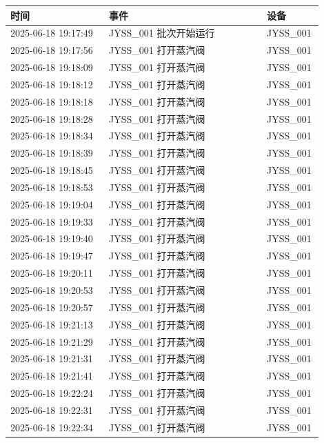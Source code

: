 \documentclass[UTF8,10pt,a4paper,fontset=fandol]{ctexart}
\begin{document}
\begin{center}
\small
\begin{tabular}{|p{0.30\linewidth}|p{0.48\linewidth}|p{0.12\linewidth}|}
\hline
\textbf{时间} & \textbf{事件} & \textbf{设备} \\
\hline
2025-06-18 19:17:49 & JYSS\_001 批次开始运行 & JYSS\_001 \\
2025-06-18 19:17:56 & JYSS\_001 打开蒸汽阀 & JYSS\_001 \\
2025-06-18 19:18:09 & JYSS\_001 打开蒸汽阀 & JYSS\_001 \\
2025-06-18 19:18:12 & JYSS\_001 打开蒸汽阀 & JYSS\_001 \\
2025-06-18 19:18:18 & JYSS\_001 打开蒸汽阀 & JYSS\_001 \\
2025-06-18 19:18:28 & JYSS\_001 打开蒸汽阀 & JYSS\_001 \\
2025-06-18 19:18:34 & JYSS\_001 打开蒸汽阀 & JYSS\_001 \\
2025-06-18 19:18:39 & JYSS\_001 打开蒸汽阀 & JYSS\_001 \\
2025-06-18 19:18:45 & JYSS\_001 打开蒸汽阀 & JYSS\_001 \\
2025-06-18 19:18:53 & JYSS\_001 打开蒸汽阀 & JYSS\_001 \\
2025-06-18 19:19:04 & JYSS\_001 打开蒸汽阀 & JYSS\_001 \\
2025-06-18 19:19:33 & JYSS\_001 打开蒸汽阀 & JYSS\_001 \\
2025-06-18 19:19:40 & JYSS\_001 打开蒸汽阀 & JYSS\_001 \\
2025-06-18 19:19:47 & JYSS\_001 打开蒸汽阀 & JYSS\_001 \\
2025-06-18 19:20:11 & JYSS\_001 打开蒸汽阀 & JYSS\_001 \\
2025-06-18 19:20:53 & JYSS\_001 打开蒸汽阀 & JYSS\_001 \\
2025-06-18 19:20:57 & JYSS\_001 打开蒸汽阀 & JYSS\_001 \\
2025-06-18 19:21:13 & JYSS\_001 打开蒸汽阀 & JYSS\_001 \\
2025-06-18 19:21:29 & JYSS\_001 打开蒸汽阀 & JYSS\_001 \\
2025-06-18 19:21:31 & JYSS\_001 打开蒸汽阀 & JYSS\_001 \\
2025-06-18 19:21:41 & JYSS\_001 打开蒸汽阀 & JYSS\_001 \\
2025-06-18 19:22:24 & JYSS\_001 打开蒸汽阀 & JYSS\_001 \\
2025-06-18 19:22:31 & JYSS\_001 打开蒸汽阀 & JYSS\_001 \\
2025-06-18 19:22:34 & JYSS\_001 打开蒸汽阀 & JYSS\_001 \\

\end{tabular}
\end{center}
\end{document}

